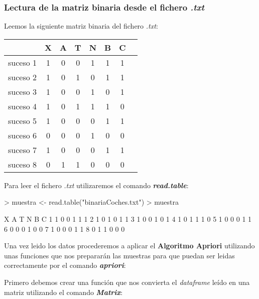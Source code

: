 \documentclass [a4paper] {article}
\begin{document}
\subsubsection{Lectura de la matriz binaria desde el fichero \textit{.txt}}
Leemos la siguiente matriz binaria del fichero \textit{.txt}:

\begin{center}
\begin{tabular}{|c|c|c|c|c|c|c|c}
\hline
         & X & A & T & N & B & C \\ \hline
suceso 1 & 1   & 0    & 0    & 1     & 1     & 1   \\ \hline
suceso 2 & 1   & 0    & 1    & 0     & 1     & 1  \\ \hline
suceso 3 & 1   & 0    & 0    & 1     & 0     & 1  \\ \hline
suceso 4 & 1   & 0    & 1    & 1     & 1     & 0  \\ \hline
suceso 5 & 1   & 0    & 0    & 0     & 1     & 1  \\ \hline
suceso 6 & 0   & 0    & 0    & 1     & 0     & 0  \\ \hline
suceso 7 & 1   & 0    & 0    & 0     & 1     & 1  \\ \hline
suceso 8 & 0   & 1    & 1    & 0     & 0     & 0  \\ \hline
\end{tabular}
\end{center}

Para leer el fichero \textit{.txt} utilizaremos el comando \textbf{\textit{read.table}}:
\begin{Schunk}
\begin{Sinput}
> muestra <- read.table("binariaCoches.txt")
> muestra
\end{Sinput}
\begin{Soutput}
  X A T N B C
1 1 0 0 1 1 1
2 1 0 1 0 1 1
3 1 0 0 1 0 1
4 1 0 1 1 1 0
5 1 0 0 0 1 1
6 0 0 0 1 0 0
7 1 0 0 0 1 1
8 0 1 1 0 0 0
\end{Soutput}
\end{Schunk}

Una vez leido los datos procederemos a aplicar el \textbf{Algoritmo Apriori} utilizando unas funciones que 
nos prepararán las muestras para que puedan ser leidas correctamente por el comando \textbf{\textit{apriori}}:

Primero debemos crear una función que nos convierta el \textit{dataframe} leído en una matriz utilizando el comando \textbf{\textit{Matrix}}:

\newpage
\end{document}
